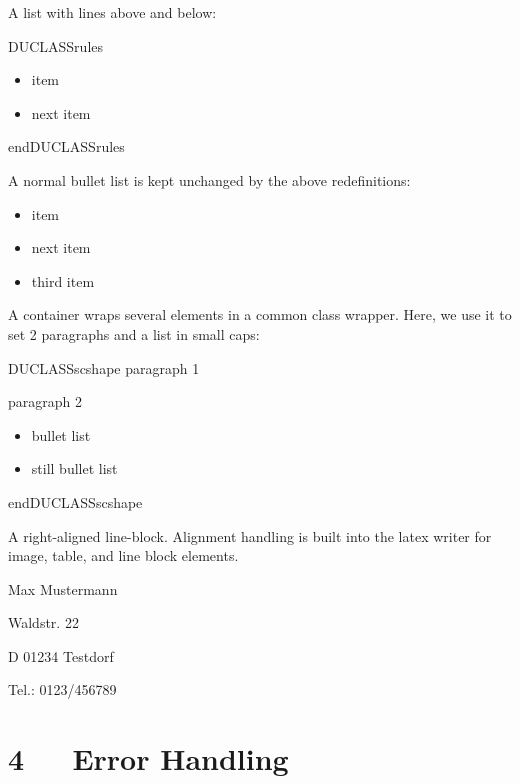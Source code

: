 \documentclass[a4paper]{memoir}
\newenvironment{DUclass}[1]%
    {%
     \def\DocutilsClassFunctionName{DUCLASS#1}
     \csname \DocutilsClassFunctionName \endcsname}%
    {\csname end\DocutilsClassFunctionName \endcsname}%
\newenvironment{DUlineblock}[1]{%
    \list{}{\setlength{\partopsep}{\parskip}
            \addtolength{\partopsep}{\baselineskip}
            \setlength{\topsep}{0pt}
            \setlength{\itemsep}{0.15\baselineskip}
            \setlength{\parsep}{0pt}
            \setlength{\leftmargin}{#1}}
    \raggedright
  }
  {\endlist}
\begin{document}
A list with lines above and below:

\begin{DUclass}{rules}
\begin{itemize}
\item item

\item next item
\end{itemize}
\end{DUclass}

A normal bullet list is kept unchanged by the above redefinitions:

\begin{itemize}
\item item

\item next item

\item third item
\end{itemize}

A container wraps several elements in a common \textquotedbl{}class wrapper\textquotedbl{}. Here, we use
it to set 2 paragraphs and a list in small caps:

\newcommand*{\DUCLASSscshape}{\scshape}

\begin{DUclass}{scshape}
paragraph 1

paragraph 2

\begin{itemize}
\item bullet list

\item still bullet list
\end{itemize}
\end{DUclass}

A right-aligned line-block. Alignment handling is built into the latex
writer for image, table, and line block elements.

\begin{DUlineblock}{0em}
\raggedleft
\item[] Max Mustermann
\item[] Waldstr. 22
\item[] D 01234 Testdorf
\item[] Tel.: 0123/456789
\end{DUlineblock}



\chapter{4   Error Handling}
\end{document}
